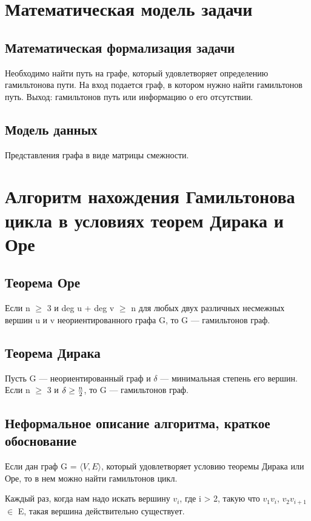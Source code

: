 \section{Математическая модель задачи}

\subsection{Математическая формализация задачи}
Необходимо найти путь на графе, который удовлетворяет определению гамильтонова пути.
На вход подается граф, в котором нужно найти гамильтонов путь.
Выход: гамильтонов путь или информацию о его отсутствии.

\subsection{Модель данных}
Представления графа в виде матрицы смежности.



\section{Алгоритм нахождения Гамильтонова цикла в условиях теорем Дирака и Оре}

\subsection{Теорема Оре}
Если n $\geq$ 3 и deg u + deg v $\geq$ n для любых двух различных несмежных вершин u и v неориентированного графа  G, то  G — гамильтонов граф.

\subsection{Теорема Дирака}
Пусть G — неориентированный граф и $\delta$ — минимальная степень его вершин.
Если n $\geq$ 3 и $\delta\geq{n\over{2}}$, то  G — гамильтонов граф.

\subsection{Неформальное описание алгоритма, краткое обоснование}
Если дан граф G = $\langle {V, E} \rangle$, который удовлетворяет условию теоремы Дирака или Оре,
то в нем можно найти гамильтонов цикл.

Каждый раз, когда нам надо искать вершину $v_i$, где i > 2, такую что $v_{1}v_{i}$, $v_{2}v_{i+1}$ $\in$ E, такая вершина действительно существует.

